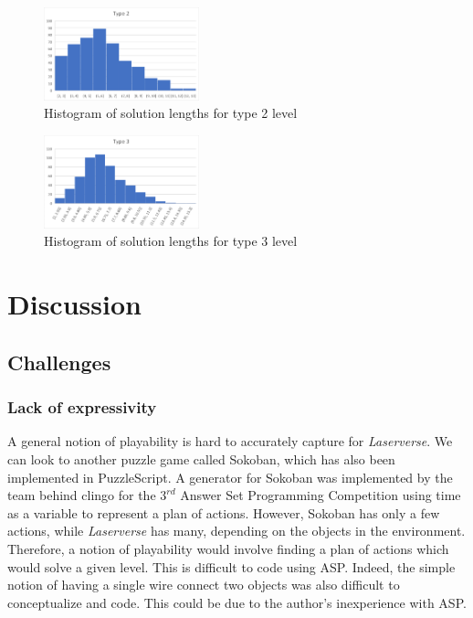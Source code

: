 \documentclass[letterpaper]{article}
\begin{document}
\begin{figure}[h]
    \centering
    \includegraphics[width=0.4\textwidth]{img/laser.png}
    \caption{Histogram of solution lengths for type 2 level}
    \label{fig:laser}
\end{figure}

\begin{figure}[h]
    \centering
    \includegraphics[width=0.4\textwidth]{img/mirror.png}
    \caption{Histogram of solution lengths for type 3 level}
    \label{fig:mirror}
\end{figure}

\section{Discussion}

\subsection{Challenges}

\subsubsection{Lack of expressivity}
A general notion of playability is hard to accurately capture for \textit{Laserverse}. We can look to another puzzle
game called Sokoban, which has also been implemented in PuzzleScript. A generator for Sokoban was implemented by the
team behind clingo for the $3^{rd}$ Answer Set Programming Competition \cite{aspcomp} using time as a variable to
represent a plan of actions. However, Sokoban has only a few actions, while \textit{Laserverse} has many, depending on
the objects in the environment. Therefore, a notion of playability would involve finding a plan of actions which would
solve a given level. This is difficult to code using ASP. Indeed, the simple notion of having a single wire connect two
objects was also difficult to conceptualize and code. This could be due to the author's inexperience with ASP.
\end{document}

